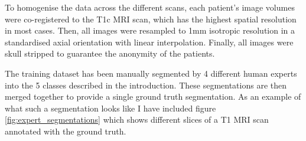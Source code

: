 \documentclass[12pt,a4paper,twoside,openright]{report}
\begin{document}
To homogenise the data across the different scans, each patient's image volumes were co-registered to the T1c MRI scan, which has the highest spatial resolution in most cases. Then, all images were resampled to 1mm isotropic resolution in a standardised axial orientation with linear interpolation. Finally, all images were skull stripped to guarantee the anonymity of the patients.

The training dataset has been manually segmented by 4 different human experts into the 5 classes described in the introduction. These segmentations are then merged together to provide a single ground truth segmentation. As an example of what such a segmentation looks like I have included figure \ref{fig:expert_segmentations} which shows different slices of a T1 MRI scan annotated with the ground truth.
\end{document}
